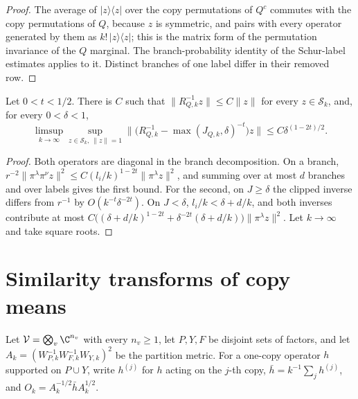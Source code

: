 \begin{proof}\leanok
    The average of $|z\rangle\langle z|$ over the copy permutations of $Q^c$ commutes
    with the copy permutations of $Q$, because $z$ is symmetric, and pairs with every
    operator generated by them as $k!\,|z\rangle\langle z|$; this is the matrix form
    of the permutation invariance of the $Q$ marginal. The branch-probability
    identity of the Schur-label estimates applies to it. Distinct branches of one
    label differ in their removed row.
\end{proof}

\begin{theorem}
    \label{thm:marked_ratio_inverse}
    \leanok
    Let $0<t<1/2$. There is $C$ such that $\|R_{Q,k}^{-1}z\|\le C\|z\|$ for every
    $z\in\mathcal S_k$, and, for every $0<\delta<1$,
    \[
        \limsup_{k\to\infty}\sup_{z\in\mathcal S_k,\ \|z\|=1}
        \bigl\|\bigl(R_{Q,k}^{-1}-\max(J_{Q,k},\delta)^{-t}\bigr)z\bigr\|
        \le C\delta^{(1-2t)/2}.
    \]
\end{theorem}

\begin{proof}\leanok
    Both operators are diagonal in the branch decomposition. On a branch,
    $r^{-2}\|\pi^\lambda\pi^\nu z\|^2\le C(l_i/k)^{1-2t}\|\pi^\lambda z\|^2$, and summing
    over at most $d$ branches and over labels gives the first bound. For the second,
    on $J\ge\delta$ the clipped inverse differs from $r^{-1}$ by $O(k^{-t}\delta^{-2t})$.
    On $J<\delta$, $l_i/k<\delta+d/k$, and both inverses contribute at most
    $C\bigl((\delta+d/k)^{1-2t}+\delta^{-2t}(\delta+d/k)\bigr)\|\pi^\lambda z\|^2$.
    Let $k\to\infty$ and take square roots.
\end{proof}

\section{Similarity transforms of copy means}

Let $\mathcal V=\bigotimes_v\C^{n_v}$ with every $n_v\ge1$, let $P,Y,F$ be disjoint
sets of factors, and let $A_k=(W_{P,k}^{-1}W_{F,k}^{-1}W_{Y,k})^2$ be the partition
metric. For a one-copy operator $h$ supported on $P\cup Y$, write $h^{(j)}$ for $h$
acting on the $j$-th copy, $\bar h=k^{-1}\sum_jh^{(j)}$, and
$O_k=A_k^{-1/2}\bar hA_k^{1/2}$.

